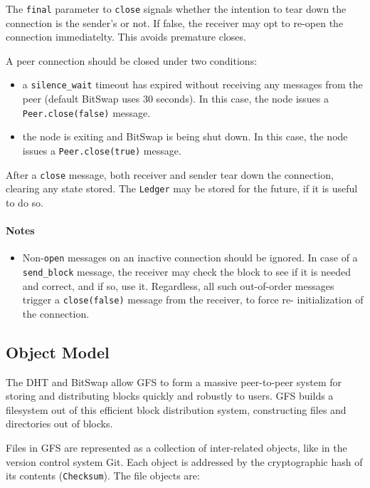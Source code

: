 \documentclass{sig-alternate}
\begin{document}
The \texttt{final} parameter to \texttt{close} signals whether the intention
to tear down the connection is the sender's or not. If false, the receiver
may opt to re-open the connection immediatelty. This avoids premature
closes.

A peer connection should be closed under two conditions:
\begin{itemize}
  \item a \texttt{silence\_wait} timeout has expired without receiving any
        messages from the peer (default BitSwap uses 30 seconds).
        In this case, the node issues a \texttt{Peer.close(false)} message.
  \item the node is exiting and BitSwap is being shut down.
        In this case, the node issues a \texttt{Peer.close(true)} message.
\end{itemize}

After a \texttt{close} message, both receiver and sender tear down the
connection, clearing any state stored. The \texttt{Ledger} may be stored for
the future, if it is useful to do so.

\paragraph{Notes}

\begin{itemize}
  \item Non-\texttt{open} messages on an inactive connection should be ignored.
        In case of a \texttt{send\_block} message, the receiver may check
        the block to see if it is needed and correct, and if so, use it.
        Regardless, all such out-of-order messages trigger a
        \texttt{close(false)} message from the receiver, to force re-
        initialization of the connection.
\end{itemize}


\subsection{Object Model}

The DHT and BitSwap allow GFS to form a massive peer-to-peer system for storing
and distributing blocks quickly and robustly to users.
GFS builds a filesystem out of this efficient block distribution system,
constructing files and directories out of blocks.

Files in GFS are represented as a collection of inter-related objects, like in
the version control system Git. Each object is addressed by the cryptographic
hash of its contents (\texttt{Checksum}). The file objects are:
\end{document}

